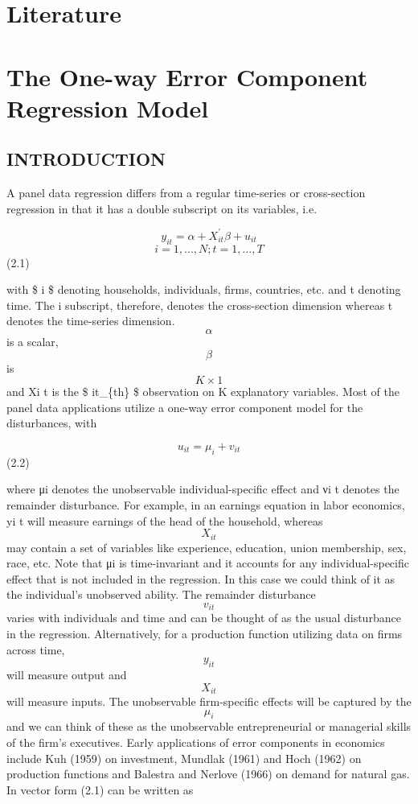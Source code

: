 \documentclass[
]{book}
\begin{document}
\hypertarget{literature}{%
\chapter{Literature}\label{literature}}

\hypertarget{the-one-way-error-component-regression-model}{%
\chapter{The One-way Error Component Regression Model}\label{the-one-way-error-component-regression-model}}

\hypertarget{introduction}{%
\section{INTRODUCTION}\label{introduction}}

A panel data regression differs from a regular time-series or cross-section regression in that it has a double subscript on its variables, i.e.

\[  y_{it}= \alpha + X_{it}^{'} \beta + u_{it}                      \] \[ i=1, ... , N  ; t=1, ... ,T  \] (2.1)

with \$ i \$ denoting households, individuals, firms, countries, etc. and t denoting time. The i subscript, therefore, denotes the cross-section dimension whereas t denotes the time-series dimension. \[ \alpha  \] is a scalar, \[ \beta \] is \[ K × 1 \] and Xi t is the \$ it\_\{th\} \$ observation on K explanatory variables. Most of the panel data applications utilize a one-way error component model for the disturbances, with

\[ u_{it}= \mu_i +  v_{it}      \] (2.2)

where μi denotes the unobservable individual-specific effect and νi t denotes the remainder disturbance. For example, in an earnings equation in labor economics, yi t will measure earnings of the head of the household, whereas \[ X_{it} \] may contain a set of variables like experience, education, union membership, sex, race, etc. Note that μi is time-invariant and it accounts for any individual-specific effect that is not included in the regression. In this case we could think of it as the individual's unobserved ability. The remainder disturbance \[ v_{it} \] varies with individuals and time and can be thought of as the usual disturbance in the regression. Alternatively, for a production function utilizing data on firms across time, \[ y_{it} \] will measure output and \[ X_{it} \] will measure inputs. The unobservable firm-specific effects will be captured by the \[ \mu_i \] and we can think of these as the unobservable entrepreneurial or managerial skills of the firm's executives. Early applications of error components in economics include Kuh (1959) on investment, Mundlak (1961) and Hoch (1962) on production functions and Balestra and Nerlove (1966) on demand for natural gas. In vector form (2.1) can be written as
\end{document}
